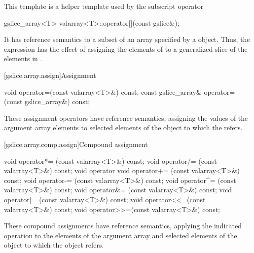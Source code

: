 \pnum
This template is a helper template used by the
subscript operator
%
%
\begin{itemdecl}
gslice_array<T> valarray<T>::operator[](const gslice&);
\end{itemdecl}

\pnum
It has reference semantics to a subset of an array specified by a
object.
Thus, the expression
has the effect of assigning the elements of
to a
generalized slice of the elements in
.

[gslice.array.assign]{Assignment}

%
\begin{itemdecl}
void operator=(const valarray<T>&) const;
const gslice_array& operator=(const gslice_array&) const;
\end{itemdecl}

\begin{itemdescr}
\pnum
These assignment operators have reference semantics, assigning the values
of the argument array elements to selected elements of the
object to which the
refers.
\end{itemdescr}

[gslice.array.comp.assign]{Compound assignment}

%
%
%
%
%
%
%
%
%
%
\begin{itemdecl}
void operator*= (const valarray<T>&) const;
void operator/= (const valarray<T>&) const;
void operator%
void operator+= (const valarray<T>&) const;
void operator-= (const valarray<T>&) const;
void operator^= (const valarray<T>&) const;
void operator&= (const valarray<T>&) const;
void operator|= (const valarray<T>&) const;
void operator<<=(const valarray<T>&) const;
void operator>>=(const valarray<T>&) const;
\end{itemdecl}

\begin{itemdescr}
\pnum
These compound assignments have reference semantics, applying the
indicated operation to the elements of the argument array and selected
elements of the
object to which the
object refers.
\end{itemdescr}

